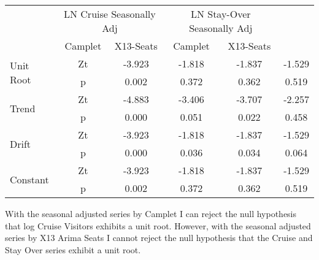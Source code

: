 \documentclass[11pt]{article}
\begin{document}
%
\begin{table} \centering
{} \label{tab:dfuller1} 
        \begin{tabular}{l c|c|c|c|c}
\toprule
            &   \multicolumn{2}{c}{ LN Cruise Seasonally Adj} &    \multicolumn{2}{c}{LN Stay-Over Seasonally Adj}\\
            &    Camplet &  X13-Seats &     Camplet &  X13-Seats \\
            \midrule
\multirow{ 2}{*}{Unit Root} & Zt          &      -3.923&      -1.818&      -1.837&      -1.529 \\
& p           &       0.002&       0.372&       0.362&       0.519\\
\hline
\multirow{ 2}{*}{Trend} & Zt          &      -4.883&      -3.406&      -3.707&      -2.257\\
& p           &       0.000&       0.051&       0.022&       0.458\\
\hline
\multirow{ 2}{*}{Drift} & Zt          &      -3.923&      -1.818&      -1.837&      -1.529\\
& p           &       0.000&       0.036&       0.034&       0.064\\
\hline
\multirow{ 2}{*}{Constant} & Zt          &      -3.923&      -1.818&      -1.837&      -1.529\\
& p           &       0.002&       0.372&       0.362&       0.519\\
\bottomrule
\end{tabular}
\end{table}

With the seasonal adjusted series by Camplet I can reject the null hypothesis that log Cruise Visitors exhibits a unit root. However, with the seasonal adjusted series by X13 Arima Seats I cannot reject the null hypothesis that the Cruise and Stay Over series exhibit a unit root.
\end{document}
